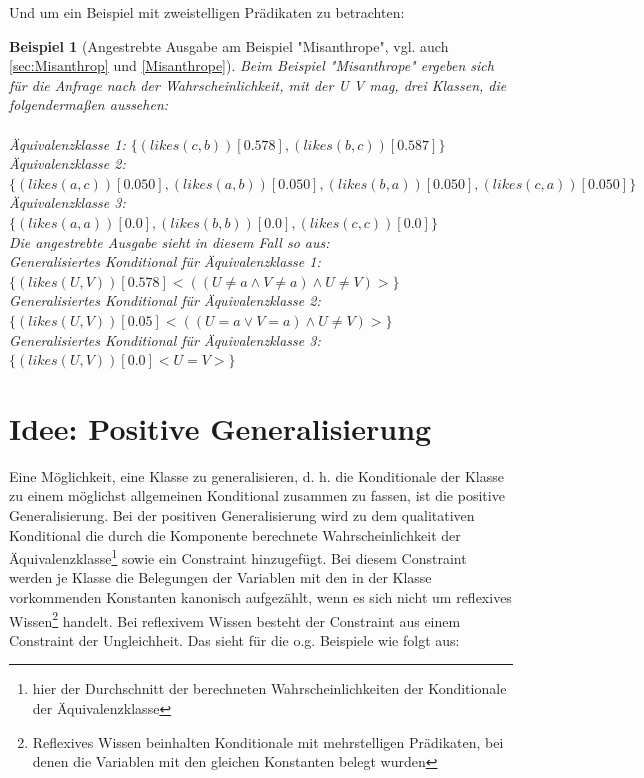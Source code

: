 \documentclass[a4paper, 11pt]{book}
\newtheorem{Bsp}{Beispiel}[section]
\begin{document}
Und um ein Beispiel mit zweistelligen Prädikaten zu betrachten: 

	\label{Ausgabe_Misanthrope}
	\begin{Bsp}[Angestrebte Ausgabe am Beispiel "{}Misanthrope"{}, vgl. auch \ref{sec:Misanthrop} und \ref{Misanthrope}]
		Beim Beispiel "{}Misanthrope"{} ergeben sich für die Anfrage nach der Wahrscheinlichkeit, mit der U V mag, drei Klassen, die folgendermaßen aussehen:\\
		\\
		Äquivalenzklasse 1: $ \{(likes(c,b))[0.578], (likes(b,c))[0.587]\} $\\
		Äquivalenzklasse 2: $ \{(likes(a,c))[0.050], (likes(a,b))[0.050], (likes(b,a))[0.050],
		 (likes(c,a))[0.050]\} $\\
		Äquivalenzklasse 3: $ \{(likes(a,a))[0.0], (likes(b,b))[0.0], (likes(c,c))[0.0]\} $\\
		
		\noindent
		Die angestrebte Ausgabe sieht in diesem Fall so aus:\\
		Generalisiertes Konditional für Äquivalenzklasse 1: $ \{(likes(U,V))[0.578] <((U \neq a \land V \neq a) \land U \neq V)>\} $\\
		Generalisiertes Konditional für Äquivalenzklasse 2: $ \{(likes(U,V))[0.05] <((U = a \lor V = a) \land U \neq V)>\} $\\
		Generalisiertes Konditional für Äquivalenzklasse 3: $ \{(likes(U,V))[0.0] <U = V>\} $\\
			\end{Bsp}


\section{Idee: Positive Generalisierung}
\label{PositiveGeneralisierung}

Eine Möglichkeit, eine Klasse zu generalisieren, d. h. die Konditionale der Klasse zu einem möglichst allgemeinen Konditional zusammen zu fassen, ist die positive Generalisierung. Bei der positiven Generalisierung wird zu dem qualitativen  Konditional die durch die Komponente berechnete Wahrscheinlichkeit der Äquivalenzklasse\footnote{hier der Durchschnitt der berechneten Wahrscheinlichkeiten der Konditionale der Äquivalenzklasse} sowie ein Constraint hinzugefügt. Bei diesem Constraint werden je Klasse die Belegungen der Variablen mit den in der Klasse vorkommenden Konstanten kanonisch aufgezählt, wenn es sich nicht um reflexives Wissen\footnote{Reflexives Wissen beinhalten Konditionale mit mehrstelligen Prädikaten, bei denen die Variablen mit den gleichen Konstanten belegt wurden} handelt. Bei reflexivem Wissen besteht der Constraint aus einem Constraint der Ungleichheit.
Das sieht für die o.g. Beispiele wie folgt aus:
\end{document}
